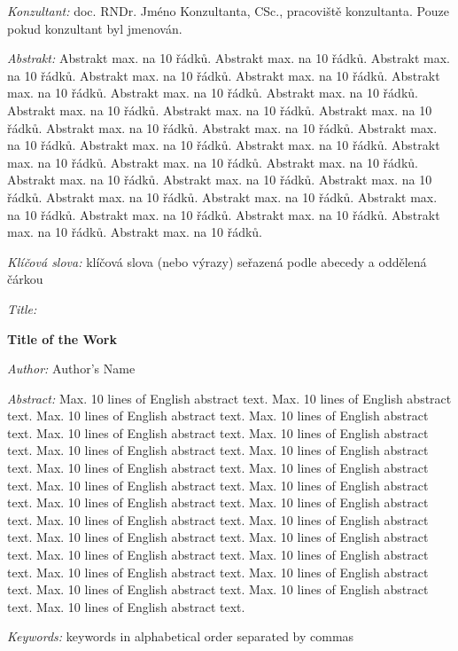 \documentclass[a4paper,11pt]{book}
\begin{document}
\bigskip

\noindent \textit{Konzultant:} doc. RNDr. Jméno Konzultanta, CSc., pracoviště
konzultanta. Pouze pokud konzultant byl jmenován.

\bigskip

\noindent \textit{Abstrakt:} Abstrakt max. na 10 řádků. Abstrakt max.
na 10 řádků. Abstrakt max. na 10 řádků. Abstrakt max. na 10 řádků.
Abstrakt max. na 10 řádků. Abstrakt max. na 10 řádků. Abstrakt max.
na 10 řádků. Abstrakt max. na 10 řádků. Abstrakt max. na 10 řádků.
Abstrakt max. na 10 řádků. Abstrakt max. na 10 řádků. Abstrakt max.
na 10 řádků. Abstrakt max. na 10 řádků. Abstrakt max. na 10 řádků.
Abstrakt max. na 10 řádků. Abstrakt max. na 10 řádků. Abstrakt max.
na 10 řádků. Abstrakt max. na 10 řádků. Abstrakt max. na 10 řádků.
Abstrakt max. na 10 řádků. Abstrakt max. na 10 řádků. Abstrakt max.
na 10 řádků. Abstrakt max. na 10 řádků. Abstrakt max. na 10 řádků.
Abstrakt max. na 10 řádků. Abstrakt max. na 10 řádků. Abstrakt max.
na 10 řádků. Abstrakt max. na 10 řádků. Abstrakt max. na 10 řádků. 

\bigskip

\noindent \textit{Klíčová slova:} klíčová slova (nebo výrazy) seřazená
podle abecedy a oddělená čárkou

\vfill

\begin{english}
	\begin{onehalfspace}
		\noindent \textit{Title:}

		\noindent \textbf{Title of the Work}
	\end{onehalfspace}

	\bigskip

	\noindent \textit{Author:} Author's Name

	\bigskip

	\noindent \textit{Abstract:} Max. 10 lines of English abstract text.
	Max. 10 lines of English abstract text. Max. 10 lines of English abstract
	text. Max. 10 lines of English abstract text. Max. 10 lines of English
	abstract text. Max. 10 lines of English abstract text. Max. 10 lines
	of English abstract text. Max. 10 lines of English abstract text.
	Max. 10 lines of English abstract text. Max. 10 lines of English abstract
	text. Max. 10 lines of English abstract text. Max. 10 lines of English
	abstract text. Max. 10 lines of English abstract text. Max. 10 lines
	of English abstract text. Max. 10 lines of English abstract text.
	Max. 10 lines of English abstract text. Max. 10 lines \cite{Allen-Cahn} of English abstract
	text. Max. 10 lines of English abstract text. Max. 10 lines of English
	abstract text. Max. 10 lines of English abstract text. Max. 10 lines
	of English abstract text. Max. 10 lines of English abstract text.
	Max. 10 lines of English abstract text. Max. 10 lines of English abstract
	text. Max. 10 lines of English abstract text.

	\bigskip

	\noindent \textit{Keywords:} keywords in alphabetical order separated
	by commas

\end{english}
\end{document}
